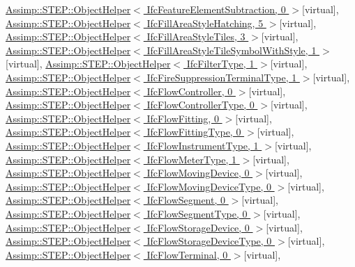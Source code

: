 \hyperlink{struct_assimp_1_1_s_t_e_p_1_1_object_helper}{Assimp\+::\+S\+T\+E\+P\+::\+Object\+Helper$<$ Ifc\+Feature\+Element\+Subtraction, 0 $>$}{\ttfamily  \mbox{[}virtual\mbox{]}}, \hyperlink{struct_assimp_1_1_s_t_e_p_1_1_object_helper}{Assimp\+::\+S\+T\+E\+P\+::\+Object\+Helper$<$ Ifc\+Fill\+Area\+Style\+Hatching, 5 $>$}{\ttfamily  \mbox{[}virtual\mbox{]}}, \hyperlink{struct_assimp_1_1_s_t_e_p_1_1_object_helper}{Assimp\+::\+S\+T\+E\+P\+::\+Object\+Helper$<$ Ifc\+Fill\+Area\+Style\+Tiles, 3 $>$}{\ttfamily  \mbox{[}virtual\mbox{]}}, \hyperlink{struct_assimp_1_1_s_t_e_p_1_1_object_helper}{Assimp\+::\+S\+T\+E\+P\+::\+Object\+Helper$<$ Ifc\+Fill\+Area\+Style\+Tile\+Symbol\+With\+Style, 1 $>$}{\ttfamily  \mbox{[}virtual\mbox{]}}, \hyperlink{struct_assimp_1_1_s_t_e_p_1_1_object_helper}{Assimp\+::\+S\+T\+E\+P\+::\+Object\+Helper$<$ Ifc\+Filter\+Type, 1 $>$}{\ttfamily  \mbox{[}virtual\mbox{]}}, \hyperlink{struct_assimp_1_1_s_t_e_p_1_1_object_helper}{Assimp\+::\+S\+T\+E\+P\+::\+Object\+Helper$<$ Ifc\+Fire\+Suppression\+Terminal\+Type, 1 $>$}{\ttfamily  \mbox{[}virtual\mbox{]}}, \hyperlink{struct_assimp_1_1_s_t_e_p_1_1_object_helper}{Assimp\+::\+S\+T\+E\+P\+::\+Object\+Helper$<$ Ifc\+Flow\+Controller, 0 $>$}{\ttfamily  \mbox{[}virtual\mbox{]}}, \hyperlink{struct_assimp_1_1_s_t_e_p_1_1_object_helper}{Assimp\+::\+S\+T\+E\+P\+::\+Object\+Helper$<$ Ifc\+Flow\+Controller\+Type, 0 $>$}{\ttfamily  \mbox{[}virtual\mbox{]}}, \hyperlink{struct_assimp_1_1_s_t_e_p_1_1_object_helper}{Assimp\+::\+S\+T\+E\+P\+::\+Object\+Helper$<$ Ifc\+Flow\+Fitting, 0 $>$}{\ttfamily  \mbox{[}virtual\mbox{]}}, \hyperlink{struct_assimp_1_1_s_t_e_p_1_1_object_helper}{Assimp\+::\+S\+T\+E\+P\+::\+Object\+Helper$<$ Ifc\+Flow\+Fitting\+Type, 0 $>$}{\ttfamily  \mbox{[}virtual\mbox{]}}, \hyperlink{struct_assimp_1_1_s_t_e_p_1_1_object_helper}{Assimp\+::\+S\+T\+E\+P\+::\+Object\+Helper$<$ Ifc\+Flow\+Instrument\+Type, 1 $>$}{\ttfamily  \mbox{[}virtual\mbox{]}}, \hyperlink{struct_assimp_1_1_s_t_e_p_1_1_object_helper}{Assimp\+::\+S\+T\+E\+P\+::\+Object\+Helper$<$ Ifc\+Flow\+Meter\+Type, 1 $>$}{\ttfamily  \mbox{[}virtual\mbox{]}}, \hyperlink{struct_assimp_1_1_s_t_e_p_1_1_object_helper}{Assimp\+::\+S\+T\+E\+P\+::\+Object\+Helper$<$ Ifc\+Flow\+Moving\+Device, 0 $>$}{\ttfamily  \mbox{[}virtual\mbox{]}}, \hyperlink{struct_assimp_1_1_s_t_e_p_1_1_object_helper}{Assimp\+::\+S\+T\+E\+P\+::\+Object\+Helper$<$ Ifc\+Flow\+Moving\+Device\+Type, 0 $>$}{\ttfamily  \mbox{[}virtual\mbox{]}}, \hyperlink{struct_assimp_1_1_s_t_e_p_1_1_object_helper}{Assimp\+::\+S\+T\+E\+P\+::\+Object\+Helper$<$ Ifc\+Flow\+Segment, 0 $>$}{\ttfamily  \mbox{[}virtual\mbox{]}}, \hyperlink{struct_assimp_1_1_s_t_e_p_1_1_object_helper}{Assimp\+::\+S\+T\+E\+P\+::\+Object\+Helper$<$ Ifc\+Flow\+Segment\+Type, 0 $>$}{\ttfamily  \mbox{[}virtual\mbox{]}}, \hyperlink{struct_assimp_1_1_s_t_e_p_1_1_object_helper}{Assimp\+::\+S\+T\+E\+P\+::\+Object\+Helper$<$ Ifc\+Flow\+Storage\+Device, 0 $>$}{\ttfamily  \mbox{[}virtual\mbox{]}}, \hyperlink{struct_assimp_1_1_s_t_e_p_1_1_object_helper}{Assimp\+::\+S\+T\+E\+P\+::\+Object\+Helper$<$ Ifc\+Flow\+Storage\+Device\+Type, 0 $>$}{\ttfamily  \mbox{[}virtual\mbox{]}}, \hyperlink{struct_assimp_1_1_s_t_e_p_1_1_object_helper}{Assimp\+::\+S\+T\+E\+P\+::\+Object\+Helper$<$ Ifc\+Flow\+Terminal, 0 $>$}{\ttfamily  \mbox{[}virtual\mbox{]}}, 